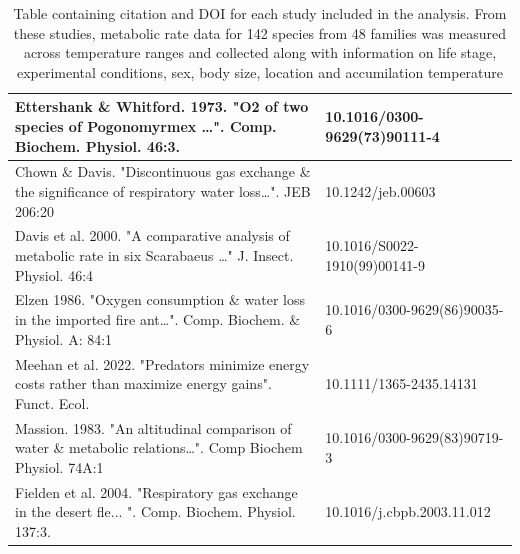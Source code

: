 \documentclass{article}
\begin{document}
\begin{table}[h]
\begin{tabular}{|l|l|}
Ettershank \& Whitford. 1973.   "O2 of two species of Pogonomyrmex …". Comp.   Biochem. Physiol. 46:3. & 10.1016/0300-9629(73)90111-4 \\ \hline
Chown \& Davis. "Discontinuous  gas exchange \& the significance of respiratory water loss…". JEB   206:20 & 10.1242/jeb.00603 \\ \hline
Davis et al. 2000. "A comparative   analysis of metabolic rate in six Scarabaeus …" J. Insect. Physiol. 46:4 & 10.1016/S0022-1910(99)00141-9 \\ \hline
Elzen 1986. "Oxygen consumption  \& water loss in the imported fire ant…". Comp. Biochem. \&   Physiol. A: 84:1 & 10.1016/0300-9629(86)90035-6 \\ \hline
Meehan et al. 2022. "Predators  minimize energy costs rather than maximize energy gains". Funct.   Ecol. & 10.1111/1365-2435.14131 \\ \hline
Massion. 1983. "An altitudinal  comparison of water \& metabolic relations…". Comp Biochem Physiol.   74A:1 & 10.1016/0300-9629(83)90719-3 \\ \hline
Fielden et al. 2004.  "Respiratory gas exchange in the desert fle... ".   Comp. Biochem. Physiol. 137:3. & 10.1016/j.cbpb.2003.11.012 \\ \hline
\end{tabular}
\caption{\label{Table:S2} Table containing citation and DOI for each study included in the analysis. From these studies, metabolic rate data for 142 species from 48 families was measured across temperature ranges and collected along with information on life stage, experimental conditions, sex, body size, location and accumilation temperature}
\end{table}


\clearpage


\end{document}
